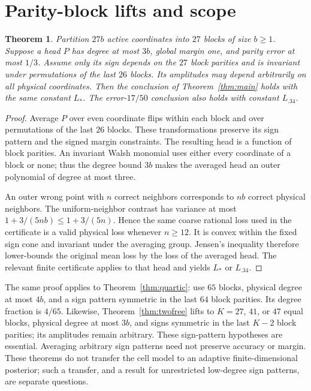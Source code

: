 \documentclass[11pt]{article}
\newtheorem{theorem}{Theorem}
\begin{document}
\section{Parity-block lifts and scope}
\begin{theorem}\label{thm:lift}
Partition $27b$ active coordinates into $27$ blocks of size $b\ge1$. Suppose a head $P$ has degree at most $3b$, global margin one, and parity error at most $1/3$. Assume only its \emph{sign} depends on the $27$ block parities and is invariant under permutations of the last $26$ blocks. Its amplitudes may depend arbitrarily on all physical coordinates. Then the conclusion of Theorem~\ref{thm:main} holds with the same constant $L_*$. The error-$17/50$ conclusion also holds with constant $L_{.34}$.
\end{theorem}
\begin{proof}
Average $P$ over even coordinate flips within each block and over permutations of the last $26$ blocks. These transformations preserve its sign pattern and the signed margin constraints. The resulting head is a function of block parities. An invariant Walsh monomial uses either every coordinate of a block or none; thus the degree bound $3b$ makes the averaged head an outer polynomial of degree at most three.

An outer wrong point with $n$ correct neighbors corresponds to $nb$ correct physical neighbors. The uniform-neighbor contrast has variance at most $1+3/(5nb)\le1+3/(5n)$. Hence the same coarse rational loss used in the certificate is a valid physical loss whenever $n\ge12$. It is convex within the fixed sign cone and invariant under the averaging group. Jensen's inequality therefore lower-bounds the original mean loss by the loss of the averaged head. The relevant finite certificate applies to that head and yields $L_*$ or $L_{.34}$.
\end{proof}

The same proof applies to Theorem~\ref{thm:quartic}: use $65$ blocks, physical degree at most $4b$, and a sign pattern symmetric in the last $64$ block parities. Its degree fraction is $4/65$. Likewise, Theorem~\ref{thm:twofree} lifts to $K=27$, $41$, or $47$ equal blocks, physical degree at most $3b$, and signs symmetric in the last $K-2$ block parities; its amplitudes remain arbitrary. These sign-pattern hypotheses are essential. Averaging arbitrary sign patterns need not preserve accuracy or margin. These theorems do not transfer the cell model to an adaptive finite-dimensional posterior; such a transfer, and a result for unrestricted low-degree sign patterns, are separate questions.
\end{document}
